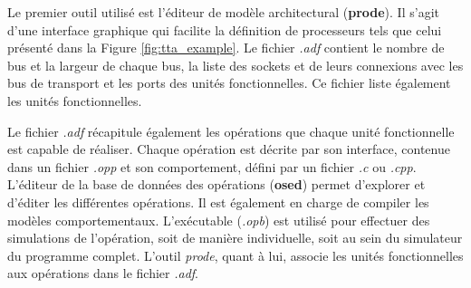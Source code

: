 Le premier outil utilisé est l'éditeur de modèle architectural (\textbf{prode}). Il s'agit d'une interface graphique qui facilite la définition de processeurs tels que celui présenté dans la Figure \ref{fig:tta_example}. Le fichier \textit{.adf} contient le nombre de bus et la largeur de chaque bus, la liste des sockets et de leurs connexions avec les bus de transport et les ports des unités fonctionnelles. Ce fichier liste également les unités fonctionnelles.

Le fichier \textit{.adf} récapitule également les opérations que chaque unité fonctionnelle est capable de réaliser. Chaque opération est décrite par son interface, contenue dans un fichier \textit{.opp} et son comportement, défini par un fichier \textit{.c} ou \textit{.cpp}. L'éditeur de la base de données des opérations (\textbf{osed}) permet d'explorer et d'éditer les différentes opérations. Il est également en charge de compiler les modèles comportementaux. L'exécutable (\textit{.opb}) est utilisé pour effectuer des simulations de l'opération, soit de manière individuelle, soit au sein du simulateur du programme complet. L'outil \textit{prode}, quant à lui, associe les unités fonctionnelles aux opérations dans le fichier \textit{.adf}.

